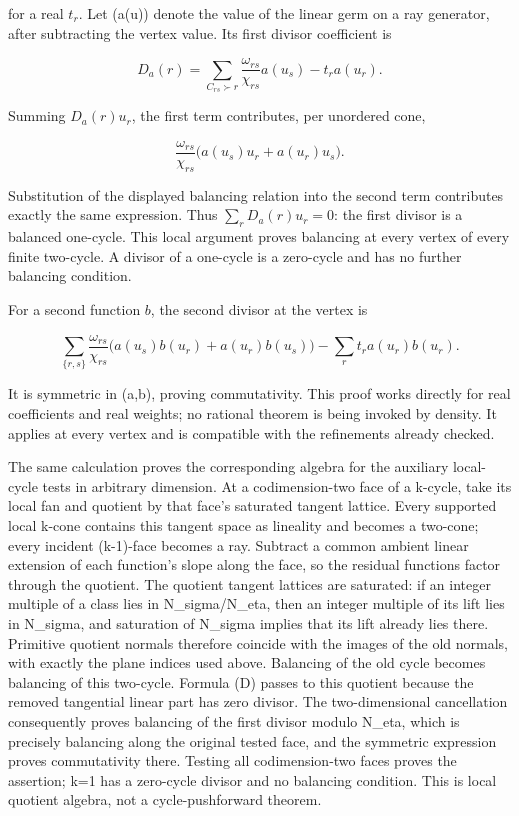 \documentclass[
  10pt,
]{article}
\begin{document}
for a real \(t_r\). Let (a(u)) denote the value of the linear germ on a
ray generator, after subtracting the vertex value. Its first divisor
coefficient is

\[
D_a(r)=\sum_{C_{rs}\succ r}\frac{\omega_{rs}}{\chi_{rs}}a(u_s)-t_r a(u_r). \tag{A}
\]

Summing \(D_a(r)u_r\), the first term contributes, per unordered cone,

\[
\frac{\omega_{rs}}{\chi_{rs}}
\bigl(a(u_s)u_r+a(u_r)u_s\bigr).
\]

Substitution of the displayed balancing relation into the second term
contributes exactly the same expression. Thus \(\sum_r D_a(r)u_r=0\):
the first divisor is a balanced one-cycle. This local argument proves
balancing at every vertex of every finite two-cycle. A divisor of a
one-cycle is a zero-cycle and has no further balancing condition.

For a second function \(b\), the second divisor at the vertex is

\[
\sum_{\{r,s\}}\frac{\omega_{rs}}{\chi_{rs}}
\bigl(a(u_s)b(u_r)+a(u_r)b(u_s)\bigr)
-\sum_r t_r a(u_r)b(u_r). \tag{B}
\]

It is symmetric in (a,b), proving commutativity. This proof works
directly for real coefficients and real weights; no rational theorem is
being invoked by density. It applies at every vertex and is compatible
with the refinements already checked.

The same calculation proves the corresponding algebra for the auxiliary
local-cycle tests in arbitrary dimension. At a codimension-two face of a
k-cycle, take its local fan and quotient by that face's saturated
tangent lattice. Every supported local k-cone contains this tangent
space as lineality and becomes a two-cone; every incident (k-1)-face
becomes a ray. Subtract a common ambient linear extension of each
function's slope along the face, so the residual functions factor
through the quotient. The quotient tangent lattices are saturated: if an
integer multiple of a class lies in N\_sigma/N\_eta, then an integer
multiple of its lift lies in N\_sigma, and saturation of N\_sigma
implies that its lift already lies there. Primitive quotient normals
therefore coincide with the images of the old normals, with exactly the
plane indices used above. Balancing of the old cycle becomes balancing
of this two-cycle. Formula (D) passes to this quotient because the
removed tangential linear part has zero divisor. The two-dimensional
cancellation consequently proves balancing of the first divisor modulo
N\_eta, which is precisely balancing along the original tested face, and
the symmetric expression proves commutativity there. Testing all
codimension-two faces proves the assertion; k=1 has a zero-cycle divisor
and no balancing condition. This is local quotient algebra, not a
cycle-pushforward theorem.
\end{document}

